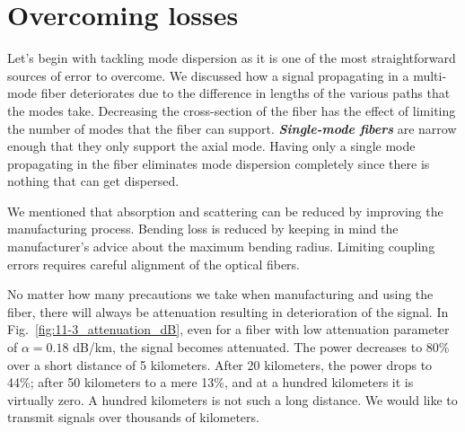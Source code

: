 \section{Overcoming losses}
\label{sec:11-4_overcoming_losses}

Let's begin with tackling mode dispersion as it is one of the most straightforward sources of error to overcome.
We discussed how a signal propagating in a multi-mode fiber deteriorates due to the difference in lengths of the various paths that the modes take.
Decreasing the cross-section of the fiber has the effect of limiting the number of modes that the fiber can support.
\textbf{\emph{Single-mode fibers}} are narrow enough that they only support the axial mode.
Having only a single mode propagating in the fiber eliminates mode dispersion completely since there is nothing that can get dispersed.

We mentioned that absorption and scattering can be reduced by improving the manufacturing process.
Bending loss is reduced by keeping in mind the manufacturer's advice about the maximum bending radius.
Limiting coupling errors requires careful alignment of the optical fibers.

No matter how many precautions we take when manufacturing and using the fiber, there will always be attenuation resulting in deterioration of the signal.
In Fig.~\ref{fig:11-3_attenuation_dB}, even for a fiber with low attenuation parameter of $\alpha=0.18$ dB/km, the signal becomes attenuated.
The power decreases to 80\% over a short distance of 5 kilometers.
After 20 kilometers, the power drops to 44\%; after 50 kilometers to a mere 13\%, and at a hundred kilometers it is virtually zero.
A hundred kilometers is not such a long distance.
We would like to transmit signals over thousands of kilometers.

